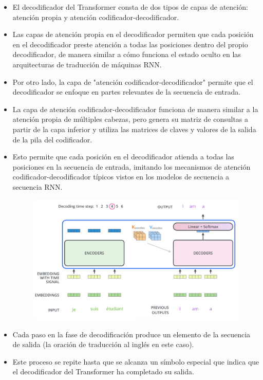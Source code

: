 \begin{itemize}
\item El decodificador del Transformer consta de dos tipos de capas de atención: atención propia y atención codificador-decodificador.

\item Las capas de atención propia en el decodificador permiten que cada posición en el decodificador preste atención a todas las posiciones dentro del propio decodificador, de manera similar a cómo funciona el estado oculto en las arquitecturas de traducción de máquinas RNN.

\item Por otro lado, la capa de "atención codificador-decodificador" permite que el decodificador se enfoque en partes relevantes de la secuencia de entrada.

\item La capa de atención codificador-decodificador funciona de manera similar a la atención propia de múltiples cabezas, pero genera su matriz de consultas a partir de la capa inferior y utiliza las matrices de claves y valores de la salida de la pila del codificador.

\item Esto permite que cada posición en el decodificador atienda a todas las posiciones en la secuencia de entrada, imitando los mecanismos de atención codificador-decodificador típicos vistos en los modelos de secuencia a secuencia RNN.

\begin{figure}[h]
  \centering
  \includegraphics[scale=0.28]{pics/transformer_decoder.png}
\end{figure}

\item Cada paso en la fase de decodificación produce un elemento de la secuencia de salida (la oración de traducción al inglés en este caso).
\item Este proceso se repite hasta que se alcanza un símbolo especial que indica que el decodificador del Transformer ha completado su salida.


\end{itemize}
